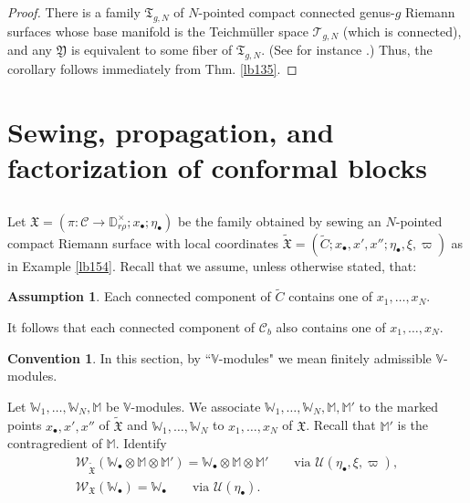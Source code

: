 \documentclass[11pt,b5paper,notitlepage]{article}
\theoremstyle{definition}
\newtheorem{ass}[df]{Assumption}
\newtheorem{cv}[df]{Convention}
\theoremstyle{plain}
\newcommand{\fk}{\mathfrak}
\newcommand{\mc}{\mathcal}
\newcommand{\wtd}{\widetilde}
\newcommand{\scr}{\mathscr}
\newcommand{\blt}{\bullet}
\newcommand{\Vbb}{\mathbb V}
\newcommand{\Wbb}{\mathbb W}
\newcommand{\Mbb}{\mathbb M}
\newcommand{\Dbb}{\mathbb D}
\numberwithin{equation}{section}
\begin{document}
\begin{proof}
There is a family $\fk T_{g,N}$ of $N$-pointed compact connected genus-$g$ Riemann surfaces whose base manifold is the Teichm\"uller space $\mc T_{g,N}$ (which is connected), and any $\fk Y$ is equivalent to some fiber of $\fk T_{g,N}$. (See for instance \cite[Chapter XV]{ACG}.) Thus, the corollary follows immediately from Thm. \ref{lb135}.
\end{proof}





\section{Sewing, propagation, and factorization of conformal blocks}




\subsection{}\label{lb169}

Let $\fk X=(\pi:\mc C\rightarrow\Dbb_{r\rho}^\times;x_\blt;\eta_\blt)$ be the family obtained by sewing an $N$-pointed compact Riemann surface with local coordinates $\wtd{\fk X}=(\wtd C;x_\blt,x',x'';\eta_\blt,\xi,\varpi)$ as in Example \ref{lb154}. Recall that we assume, unless otherwise stated, that:
\begin{ass}\label{lb157}
Each connected component of $\wtd C$ contains one of $x_1,\dots,x_N$.
\end{ass}
It follows that each connected component of $\mc C_b$ also contains one of $x_1,\dots,x_N$. 

\begin{cv}\label{lb175}
In this section, by ``$\Vbb$-modules" we mean finitely admissible $\Vbb$-modules. 
\end{cv}
Let $\Wbb_1,\dots,\Wbb_N,\Mbb$ be $\Vbb$-modules. We associate $\Wbb_1,\dots,\Wbb_N,\Mbb,\Mbb'$ to the marked points $x_\blt,x',x''$ of $\wtd{\fk X}$ and $\Wbb_1,\dots,\Wbb_N$ to $x_1,\dots,x_N$ of $\fk X$. Recall that $\Mbb'$ is the contragredient of $\Mbb$. Identify
\begin{gather*}
\scr W_{\wtd{\fk X}}(\Wbb_\blt\otimes\Mbb\otimes\Mbb')=\Wbb_\blt\otimes\Mbb\otimes\Mbb'\qquad\text{via }\mc U(\eta_\blt,\xi,\varpi),\\
\scr W_{\fk X}(\Wbb_\blt)=\Wbb_\blt\qquad\text{via }\mc U(\eta_\blt).
\end{gather*}
\end{document}
